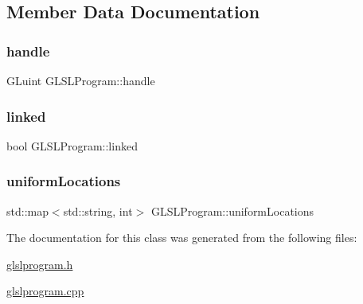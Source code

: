 \subsection{Member Data Documentation}
\mbox{\label{class_g_l_s_l_program_a196bb7b19491ab881fba685aa37c4630}} 
\subsubsection{\texorpdfstring{handle}{handle}}
{\footnotesize\ttfamily G\+Luint G\+L\+S\+L\+Program\+::handle\hspace{0.3cm}{\ttfamily [private]}}

\mbox{\label{class_g_l_s_l_program_a315534f7754fefdcb0122e97dae78d1a}} 
\subsubsection{\texorpdfstring{linked}{linked}}
{\footnotesize\ttfamily bool G\+L\+S\+L\+Program\+::linked\hspace{0.3cm}{\ttfamily [private]}}

\mbox{\label{class_g_l_s_l_program_a20eac534762b6d0485bfb29e104b4932}} 
\subsubsection{\texorpdfstring{uniformLocations}{uniformLocations}}
{\footnotesize\ttfamily std\+::map$<$std\+::string, int$>$ G\+L\+S\+L\+Program\+::uniform\+Locations\hspace{0.3cm}{\ttfamily [private]}}



The documentation for this class was generated from the following files\+:\begin{DoxyCompactItemize}
\item 
\mbox{\hyperlink{glslprogram_8h}{glslprogram.\+h}}\item 
\mbox{\hyperlink{glslprogram_8cpp}{glslprogram.\+cpp}}\end{DoxyCompactItemize}
